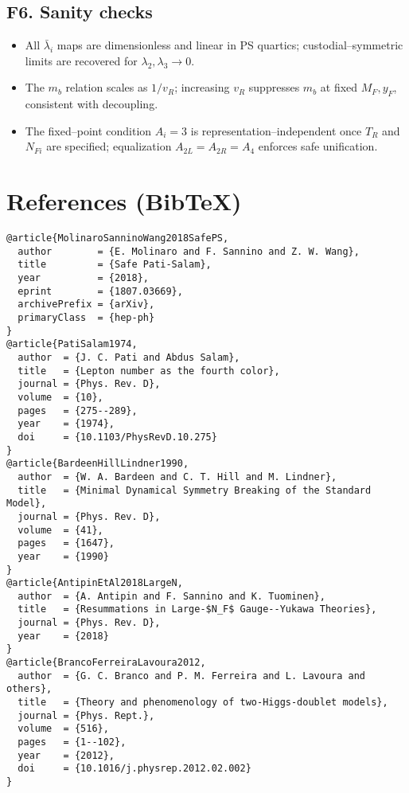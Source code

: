 \documentclass[11pt]{article}
\begin{document}
  \subsection*{F6. Sanity checks}

  \begin{itemize}
  \item All $\bar\lambda_i$ maps are dimensionless and linear in PS quartics; custodial–symmetric limits are recovered for $\lambda_2,\lambda_3\to0$.
  \item The $m_b$ relation scales as $1/v_R$; increasing $v_R$ suppresses $m_b$ at fixed $M_F,y_F$, consistent with decoupling.
  \item The fixed–point condition $A_i=3$ is representation–independent once $T_R$ and $N_{Fi}$ are specified; equalization $A_{2L}=A_{2R}=A_4$ enforces safe unification.
  \end{itemize}

  \section*{References (Bib\TeX)}
  \begin{verbatim}
@article{MolinaroSanninoWang2018SafePS,
  author        = {E. Molinaro and F. Sannino and Z. W. Wang},
  title         = {Safe Pati-Salam},
  year          = {2018},
  eprint        = {1807.03669},
  archivePrefix = {arXiv},
  primaryClass  = {hep-ph}
}
@article{PatiSalam1974,
  author  = {J. C. Pati and Abdus Salam},
  title   = {Lepton number as the fourth color},
  journal = {Phys. Rev. D},
  volume  = {10},
  pages   = {275--289},
  year    = {1974},
  doi     = {10.1103/PhysRevD.10.275}
}
@article{BardeenHillLindner1990,
  author  = {W. A. Bardeen and C. T. Hill and M. Lindner},
  title   = {Minimal Dynamical Symmetry Breaking of the Standard Model},
  journal = {Phys. Rev. D},
  volume  = {41},
  pages   = {1647},
  year    = {1990}
}
@article{AntipinEtAl2018LargeN,
  author  = {A. Antipin and F. Sannino and K. Tuominen},
  title   = {Resummations in Large-$N_F$ Gauge--Yukawa Theories},
  journal = {Phys. Rev. D},
  year    = {2018}
}
@article{BrancoFerreiraLavoura2012,
  author  = {G. C. Branco and P. M. Ferreira and L. Lavoura and others},
  title   = {Theory and phenomenology of two-Higgs-doublet models},
  journal = {Phys. Rept.},
  volume  = {516},
  pages   = {1--102},
  year    = {2012},
  doi     = {10.1016/j.physrep.2012.02.002}
}
  \end{verbatim}




  \ifdefined\standalonechapter\else
  
\end{document}
